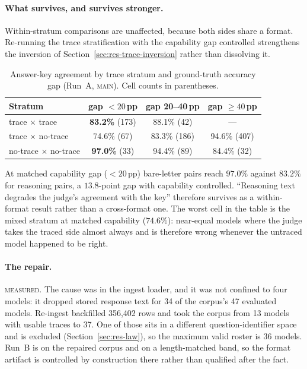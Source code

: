 \paragraph{What survives, and survives stronger.}
Within-stratum comparisons are unaffected, because both sides share a
format. Re-running the trace stratification with the capability gap
controlled strengthens the inversion of
Section~\ref{sec:res-trace-inversion} rather than dissolving it.

\begin{table}[htbp]
\centering
\caption{Answer-key agreement by trace stratum and ground-truth
accuracy gap (Run~A, \textsc{main}). Cell counts in parentheses.}
\label{tab:capture-survives}
\begin{tabular}{lccc}
\toprule
Stratum & gap $<20$\,pp & gap 20--40\,pp & gap $\geq 40$\,pp \\
\midrule
trace $\times$ trace       & \textbf{83.2\%} (173) & 88.1\% (42) & --- \\
trace $\times$ no-trace    & 74.6\% (67)  & 83.3\% (186) & 94.6\% (407) \\
no-trace $\times$ no-trace & \textbf{97.0\%} (33) & 94.4\% (89) & 84.4\% (32) \\
\bottomrule
\end{tabular}
\end{table}

At matched capability gap ($<20$\,pp) bare-letter pairs reach $97.0\%$
against $83.2\%$ for reasoning pairs, a $13.8$-point gap with
capability controlled. ``Reasoning text degrades the judge's agreement
with the key'' therefore survives as a within-format result rather than
a cross-format one. The worst cell in the table is the mixed stratum at
matched capability ($74.6\%$): near-equal models where the judge takes
the traced side almost always and is therefore wrong whenever the
untraced model happened to be right.

\paragraph{The repair.}
\textsc{measured.} The cause was in the ingest loader, and it was not
confined to four models: it dropped stored response text for 34 of the
corpus's 47 evaluated models. Re-ingest backfilled 356{,}402 rows and
took the corpus from 13 models with usable traces to 37. One of those
sits in a different question-identifier space and is excluded
(Section~\ref{sec:res-law}), so the maximum valid roster is 36 models.
Run~B is on the repaired corpus and on a length-matched band, so the
format artifact is controlled by construction there rather than
qualified after the fact.

